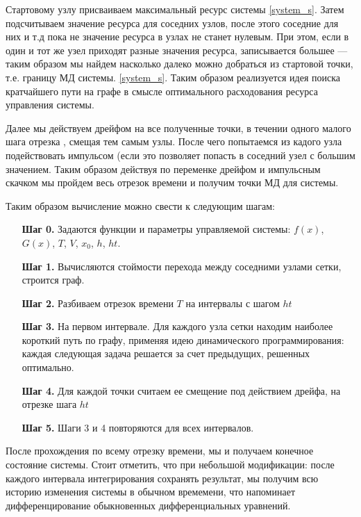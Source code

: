 \documentclass[a4paper,12pt]{article}
\begin{document}
Стартовому узлу присваиваем максимальный ресурс системы \eqref{system_s}. Затем
подсчитываем значение ресурса для соседних узлов, после этого соседние
для них и т.д пока не значение ресурса в узлах не станет нулевым. При
этом, если в один и тот же узел приходят разные значения ресурса,
записывается большее — таким образом мы найдем насколько далеко можно
добраться из стартовой точки, т.е. границу МД системы. \eqref{system_s}. Таким
образом реализуется идея поиска кратчайшего пути на графе в смысле
оптимального расходования ресурса управления системы.

Далее мы действуем дрейфом на все полученные точки, в течении одного
малого шага отрезка , смещая тем самым узлы. После чего попытаемся из
кадого узла подействовать импульсом (если это позволяет попасть в
соседний узел с большим значением.  Таким образом действуя по
переменке дрейфом и импульсным скачком мы пройдем весь отрезок времени
и получим точки МД для системы.

Таким образом вычисление можно свести к следующим шагам:
\begin{itemize}
    \item[\bf Шаг 0.] Задаются функции и параметры управляемой системы:
        $f(x)$, $G(x)$, $T$, $V$, $x_0$, $h$, $ht$.
    \item[\bf Шаг 1.] Вычисляются стоймости перехода между соседними
        узлами сетки, строится граф.
    \item[\bf Шаг 2.] 
        Разбиваем отрезок времени $T$  на интервалы с шагом $ht$
    \item[\bf Шаг 3.] 
        На первом интервале.
        Для каждого узла сетки находим наиболее короткий путь по графу,
        применяя идею динамического программирования: каждая следующая
        задача решается за счет предыдущих, решенных оптимально.
    \item[\bf Шаг 4.] Для каждой точки считаем ее смещение под действием
        дрейфа, на отрезке шага $ht$
    \item[\bf Шаг 5.] Шаги 3 и 4 повторяются для всех интервалов.

\end{itemize}

После прохождения по всему отрезку времени, мы и получаем конечное
состояние системы. Стоит отметить, что при небольшой модификации:
после каждого интервала интегрирования сохранять результат, мы получим
всю историю изменения системы в обычном времемени, что напоминает
дифференцирование обыкновенных дифференциальных уравнений.
\end{document}
